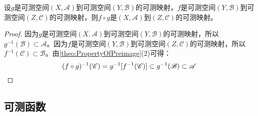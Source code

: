 \begin{theorem}
	设$g$是可测空间$(X,\mathscr{A})$到可测空间$(Y,\mathscr{B})$的可测映射，$f$是可测空间$(Y,\mathscr{B})$到可测空间$(Z,\mathscr{C})$的可测映射，则$f\circ g$是$(X,\mathscr{A})$到$(Z,\mathscr{C})$的可测映射。
\end{theorem}
\begin{proof}
	因为$g$是可测空间$(X,\mathscr{A})$到可测空间$(Y,\mathscr{B})$的可测映射，所以$g^{-1}(\mathscr{B})\subset\mathscr{A}$。因为$f$是可测空间$(Y,\mathscr{B})$到可测空间$(Z,\mathscr{C})$的可测映射，所以$f^{-1}(\mathscr{C})\subset\mathscr{B}$。由\cref{theo:PropertyOfPreimage}(2)可得：
	\begin{equation*}
		(f\circ g)^{-1}(\mathscr{C})=g^{-1}[f^{-1}(\mathscr{C})]\subset g^{-1}(\mathscr{B})\subset\mathscr{A}\qedhere
	\end{equation*}
\end{proof}

\subsection{可测函数}
